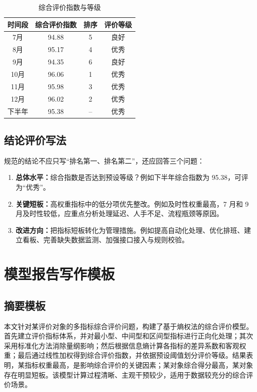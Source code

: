 \documentclass[UTF8,zihao=-4]{ctexart}
\begin{document}
\begin{table}[H]
\centering
\caption{综合评价指数与等级}
\begin{tabular}{cccc}
\toprule
时间段 & 综合评价指数 & 排序 & 评价等级 \\
\midrule
7月  & 94.88 & 5 & 良好 \\
8月  & 95.17 & 4 & 优秀 \\
9月  & 94.35 & 6 & 良好 \\
10月 & 96.06 & 1 & 优秀 \\
11月 & 95.98 & 3 & 优秀 \\
12月 & 96.02 & 2 & 优秀 \\
下半年 & 95.38 & -- & 优秀 \\
\bottomrule
\end{tabular}
\end{table}

\subsection{结论评价写法}
规范的结论不应只写“排名第一、排名第二”，还应回答三个问题：
\begin{enumerate}
  \item \textbf{总体水平：}综合指数是否达到预设等级？例如下半年综合指数为 95.38，可评为“优秀”。
  \item \textbf{关键短板：}高权重指标中的低分项优先整改。例如及时性权重最高，7 月和 9 月及时性较低，应重点分析处理延迟、人手不足、流程瓶颈等原因。
  \item \textbf{改进方向：}把指标短板转化为管理措施。例如提高自动化处理、优化排班、建立看板、完善缺失数据监测、加强接口接入与规则校验。
\end{enumerate}

\section{模型报告写作模板}

\subsection{摘要模板}
本文针对某评价对象的多指标综合评价问题，构建了基于熵权法的综合评价模型。首先建立评价指标体系，并对最小型、中间型和区间型指标进行正向化处理；其次采用标准化方法消除量纲影响；然后根据信息熵计算各指标的差异系数和客观权重；最后通过线性加权得到综合评价指数，并依据预设阈值划分评价等级。结果表明，某指标权重最高，是影响综合评价的关键因素；某对象综合得分最高，某对象存在明显短板。该模型计算过程清晰、主观干预较少，适用于数据较充分的综合评价场景。
\end{document}
